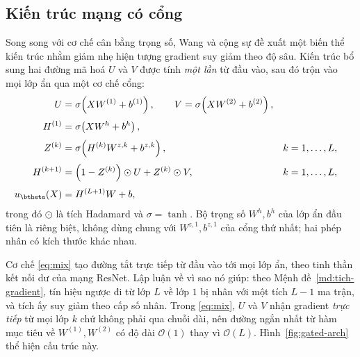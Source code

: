 \subsection{Kiến trúc mạng có cổng}
\label{subsec:gated}
 
Song song với cơ chế cân bằng trọng số, Wang và cộng sự đề xuất một biến thể kiến
trúc nhằm giảm nhẹ hiện tượng gradient suy giảm theo độ sâu. Kiến trúc bổ sung
hai đường mã hoá $U$ và $V$ được tính \emph{một lần} từ đầu vào, sau đó trộn vào
mọi lớp ẩn qua một cơ chế cổng:
\begin{align}
U &= \sigma\!\left(X W^{(1)} + b^{(1)}\right),
\qquad
V = \sigma\!\left(X W^{(2)} + b^{(2)}\right),
\label{eq:encoders}\\[3pt]
H^{(1)} &= \sigma\!\left(X W^{h} + b^{h}\right),
\label{eq:first-hidden}\\[3pt]
Z^{(k)} &= \sigma\!\left(H^{(k)} W^{z,k} + b^{z,k}\right),
&& k = 1, \dots, L,
\label{eq:gate}\\[3pt]
H^{(k+1)} &= \left(1 - Z^{(k)}\right) \odot U + Z^{(k)} \odot V,
&& k = 1, \dots, L,
\label{eq:mix}\\[3pt]
u_{\btheta}(X) &= H^{(L+1)} W + b,
\label{eq:output-improved}
\end{align}
trong đó $\odot$ là tích Hadamard và $\sigma = \tanh$. Bộ trọng số $W^{h}, b^{h}$
của lớp ẩn đầu tiên là riêng biệt, không dùng chung với $W^{z,1}, b^{z,1}$ của
cổng thứ nhất; hai phép nhân có kích thước khác nhau.
 
Cơ chế \eqref{eq:mix} tạo đường tắt trực tiếp từ đầu vào tới mọi lớp ẩn, theo
tinh thần kết nối dư của mạng ResNet. Lập luận về vì sao nó giúp: theo
Mệnh đề~\ref{md:tich-gradient}, tín hiệu ngược đi từ lớp $L$ về lớp $1$ bị nhân
với một tích $L-1$ ma trận, và tích ấy suy giảm theo cấp số nhân. Trong
\eqref{eq:mix}, $U$ và $V$ nhận gradient \emph{trực tiếp} từ mọi lớp $k$ chứ
không phải qua chuỗi dài, nên đường ngắn nhất từ hàm mục tiêu về $W^{(1)},
W^{(2)}$ có độ dài $\mathcal{O}(1)$ thay vì $\mathcal{O}(L)$. Hình~\ref{fig:gated-arch}
thể hiện cấu trúc này.
 
